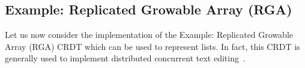 








\subsection{Example: Replicated Growable Array (RGA)}
\label{sec:rga}

Let us now consider the implementation of the Example: Replicated
Growable Array (RGA) CRDT which can be used to represent lists.
In fact, this CRDT is generally used to implement distributed
concurrent text editing~\cite{AttiyaBGMYZ16}.

